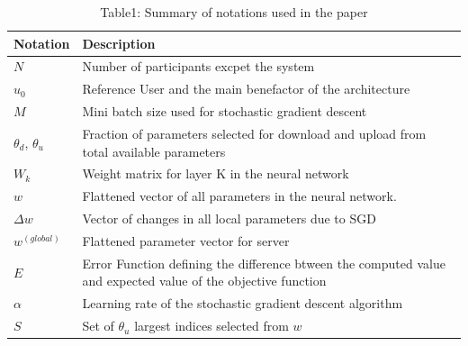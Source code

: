\documentclass[conference]{IEEEtran}
\begin{document}
\begin{table}[!h]
\centering
\caption{Table1: Summary of notations used in the paper}
\label{table:1}
\begin{tabular}{ | m{} | m{}| } 
\hline
\textbf{Notation} & \textbf{Description} \\
 \hline\hline

$N$ & Number of participants excpet the system\\
\hline
$u_0$ & Reference User and the  main benefactor of the architecture \\
\hline
$M$ & Mini batch size used for stochastic gradient descent\\
\hline
$\theta_d$, $\theta_u$ & Fraction of parameters selected for download and upload from total available parameters \\
\hline
$W_k$ & Weight matrix for layer K in the neural network\\
\hline
$w$ & Flattened vector of all parameters in the neural network. \\
\hline
$\Delta w$ & Vector of changes in all local parameters due to SGD\\
\hline
$w^{(global)}$ & Flattened parameter vector for server\\
\hline
$E$ & Error Function defining the difference btween the computed value and expected value of the objective function \\
\hline
$\alpha$ & Learning rate of the stochastic gradient descent algorithm\\
\hline
$S$ & Set of $\theta_u$ largest indices selected from $w$ \\
\hline
\end{tabular}
\end{table}
\end{document}
